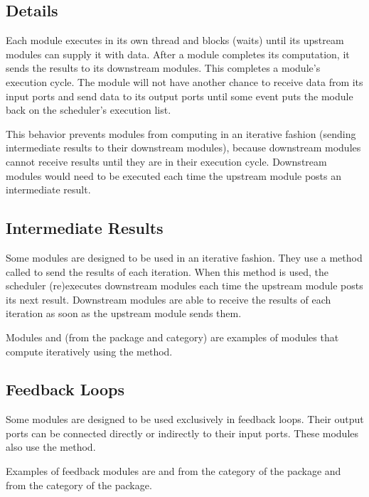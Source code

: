 \subsection{Details}

Each module executes in its own thread and blocks (waits) until its upstream
modules can supply it with data.  After a module completes its computation,
it sends the results to its downstream modules.  This completes a module's
execution cycle.  The module will not have another chance to receive data from its input ports
and send data to its output ports until some event
puts the  module back on the scheduler's execution list.  

This behavior prevents modules from computing in an iterative fashion 
(sending intermediate results to their downstream modules), because
downstream modules cannot receive results until they are in their
execution cycle. Downstream modules would need to be executed each time the
upstream module posts an intermediate result.


\subsection{Intermediate Results}

Some modules are designed to be used in an iterative fashion. They use
a method called  to send the results of each
iteration.  When this method is used, the scheduler (re)executes
downstream modules each time the upstream module posts its next
result.  Downstream modules are able to receive the results of each
iteration as soon as the upstream module sends them.

Modules  and  (from the
\package{\sr} package and  category) are examples of modules
that compute iteratively using the  method.

\subsection{Feedback Loops}

Some modules are designed to be used exclusively in feedback
loops. Their output ports can be connected
directly or indirectly to their input ports.  These modules also use the
 method.

Examples of feedback modules are  and
 from the  category of the
 package and  from the
 category of the  package.

